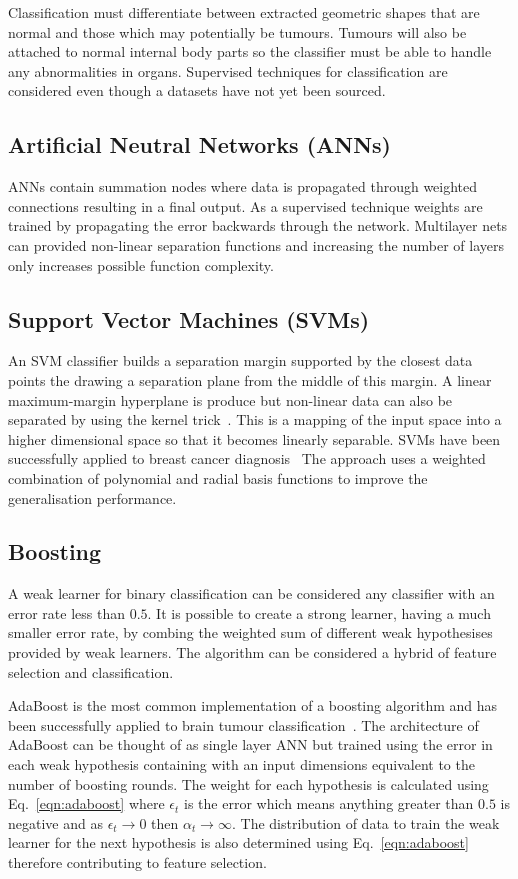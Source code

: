 \documentclass[journal]{IEEEtran}
\begin{document}
Classification must differentiate between extracted geometric shapes that are normal and those which may potentially be tumours.
Tumours will also be attached to normal internal body parts so the classifier must be able to handle any abnormalities in organs.
Supervised techniques for classification are considered even though a datasets have not yet been sourced.



\subsection{Artificial Neutral Networks (ANNs)}
ANNs contain summation nodes where data is propagated through weighted connections resulting in a final output. 
As a supervised technique weights are trained by propagating the error backwards through the network.
Multilayer nets can provided non-linear separation functions and increasing the number of layers only increases possible function complexity.




\subsection{Support Vector Machines (SVMs)}
An SVM classifier builds a separation margin supported by the closest data points the drawing a separation plane from the middle of this margin.
A linear maximum-margin hyperplane is produce but non-linear data can also be separated by using the kernel trick~\cite{cortes95support}. 
This is a mapping of the input space into a higher dimensional space so that it becomes linearly separable.
SVMs have been successfully applied to breast cancer diagnosis~\cite{xiufeng13svm}
The approach uses a weighted combination of polynomial and radial basis functions to improve the generalisation performance.



\subsection{Boosting}
A weak learner for binary classification can be considered any classifier with an error rate less than $0.5$.
It is possible to create a strong learner, having a much smaller error rate, by combing the weighted sum of different weak hypothesises provided by weak learners. 
The algorithm can be considered a hybrid of feature selection and classification.

AdaBoost is the most common implementation of a boosting algorithm and has been successfully applied to brain tumour classification~\cite{freund99boost,islam13multi}.
The architecture of AdaBoost can be thought of as single layer ANN but trained using the error in each weak hypothesis containing with an input dimensions equivalent to the number of boosting rounds.
The weight for each hypothesis is calculated using Eq.~\eqref{eqn:adaboost} where $\epsilon_t$ is the error which means anything greater than $0.5$ is negative and as $\epsilon_t \to 0$ then $\alpha_t \to \infty$.
The distribution of data to train the weak learner for the next hypothesis is also determined using Eq.~\eqref{eqn:adaboost} therefore contributing to feature selection.
\end{document}
